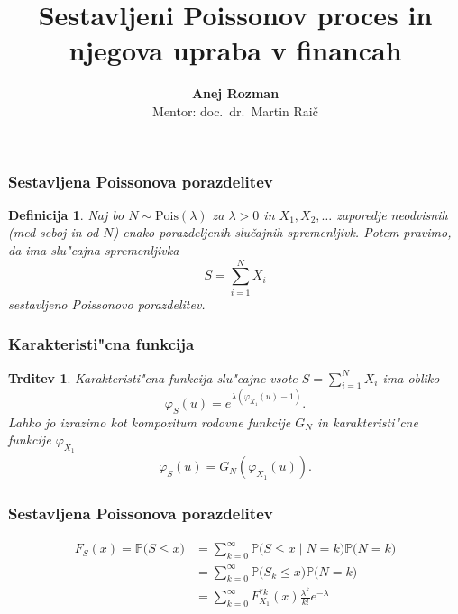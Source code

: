 \documentclass[]{beamer} %
\title[CPP in njegova uporaba v financah]{Sestavljeni Poissonov proces in njegova upraba v financah}
\subtitle{}
\author[Anej Rozman]{\textbf{Anej Rozman} \\ \footnotesize Mentor: doc.~dr.~Martin Raič}
\institute[UL-FMF]{Univerza v Ljubljani, Fakulteta za matematiko in fiziko}
\date[]{}
\theoremstyle{plain}
\newtheorem{definicija}{Definicija}
\newtheorem{trditev}{Trditev}
\newcommand{\Prob}{\mathbb{P}}
\newcommand{\Pois}[1]{\text{Pois}(#1)}
\begin{document}
\frame{\titlepage}


\begin{frame}
  \frametitle{Sestavljena Poissonova porazdelitev}
  \begin{definicija}
    Naj bo $N\sim \Pois{\lambda}$  za $\lambda >0$ in $X_1, X_2, \dots$ zaporedje neodvisnih (med seboj in od $N$)
    enako porazdeljenih slučajnih spremenljivk. Potem pravimo, da ima slu"cajna spremenljivka
    \begin{equation*}
        S = \sum_{i=1}^NX_i
    \end{equation*}
    \textit{sestavljeno Poissonovo porazdelitev}. 
    \label{def:sestavljenaPoissonovaPorazdelitev}
  \end{definicija}
\end{frame}

\begin{frame}
  \frametitle{Karakteristi"cna funkcija}
  \begin{trditev}
    Karakteristi"cna funkcija slu"cajne vsote $S=\sum_{i = 1}^{N}X_i$ ima obliko 
    \begin{equation*}
        \varphi_{S}(u) = e^{\lambda \left(\varphi_{X_1}(u) - 1\right)}.
    \end{equation*}
    Lahko jo izrazimo kot kompozitum rodovne funkcije $G_N$ in karakteristi"cne funkcije $\varphi_{X_1}$
    \begin{align*}
      \varphi_{S}(u) = G_{N}\left(\varphi_{X_1}(u)\right).
  \end{align*}
    \label{pos:RodovnaKarakteristicna}
  \end{trditev}
\end{frame}
 
\begin{frame}
  \frametitle{Sestavljena Poissonova porazdelitev}
  \begin{align*}
    F_{S}(x) = \Prob\bigl(S \leq x\bigr) 
    &= \sum_{k=0}^\infty \Prob\bigl(S \leq x \mid N = k\bigr)\Prob\bigl(N = k\bigr) \\
    &= \sum_{k=0}^\infty \Prob\bigl(S_k \leq x\bigr)\Prob\bigl(N = k\bigr) \\
    &= \sum_{k=0}^\infty F_{X_1}^{*k}(x) \frac{\lambda^k}{k!} e^{-\lambda}
  \end{align*}
\end{frame}
\end{document}
